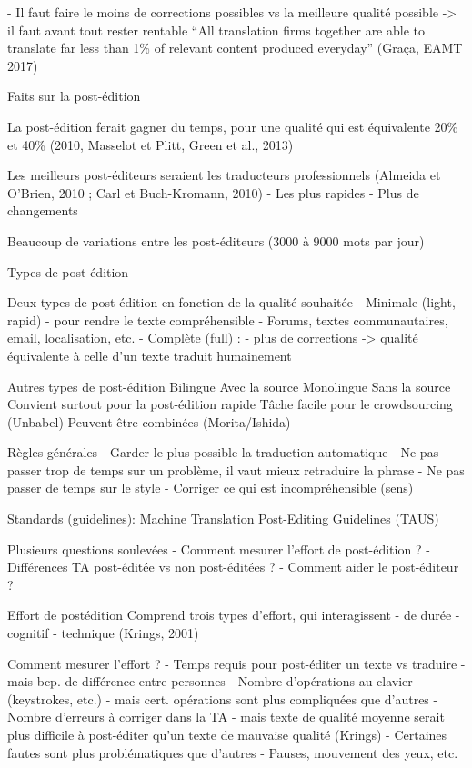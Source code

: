 - Il faut faire le moins de corrections possibles vs la meilleure qualité possible -> il faut avant tout rester rentable
“All translation firms together are able to translate far less than 1\% of relevant content produced everyday” (Graça, EAMT 2017)

Faits sur la post-édition

La post-édition ferait gagner du temps, pour une qualité qui est équivalente
20\% et 40\% (2010, Masselot et Plitt, Green et al., 2013)

Les meilleurs post-éditeurs seraient les traducteurs professionnels (Almeida et O’Brien, 2010 ; Carl et Buch-Kromann, 2010)
    - Les plus rapides
    - Plus de changements

Beaucoup de variations entre les post-éditeurs (3000 à 9000 mots par jour)

Types de post-édition

Deux types de post-édition en fonction de la qualité souhaitée
    - Minimale (light, rapid)
        - pour rendre le texte compréhensible
        - Forums, textes communautaires, email, localisation, etc.
    - Complète (full) :
        - plus de corrections -> qualité équivalente à celle d’un texte traduit humainement

Autres types de post-édition
    Bilingue
        Avec la source
    Monolingue
        Sans la source
        Convient surtout pour la post-édition rapide
        Tâche facile pour le crowdsourcing (Unbabel)
    Peuvent être combinées (Morita/Ishida)

Règles générales
    - Garder le plus possible la traduction automatique
    - Ne pas passer trop de temps sur un problème, il vaut mieux retraduire la phrase
    - Ne pas passer de temps sur le style
    - Corriger ce qui est incompréhensible (sens)

Standards (guidelines): Machine Translation Post-Editing Guidelines (TAUS)

Plusieurs questions soulevées
- Comment mesurer l’effort de post-édition ?
- Différences TA post-éditée vs non post-éditées ?
- Comment aider le post-éditeur ?

Effort de postédition
Comprend trois types d’effort, qui interagissent
    - de durée
    - cognitif
    - technique (Krings, 2001)

Comment mesurer l’effort ?
- Temps requis pour post-éditer un texte vs traduire
    - mais bcp. de différence entre personnes
- Nombre d’opérations au clavier (keystrokes, etc.)
    - mais cert. opérations sont plus compliquées que d’autres
- Nombre d’erreurs à corriger dans la TA
    - mais texte de qualité moyenne serait plus difficile à post-éditer qu’un texte de mauvaise qualité (Krings)
    - Certaines fautes sont plus problématiques que d’autres
- Pauses, mouvement des yeux, etc.

